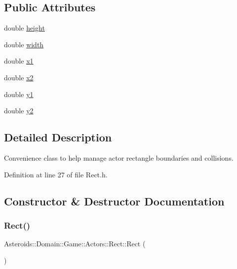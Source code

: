 \subsection*{Public Attributes}
\begin{DoxyCompactItemize}
\item 
double \hyperlink{classAsteroids_1_1Domain_1_1Game_1_1Actors_1_1Rect_a60cb0fe29e20d550b38e93c50c160702}{height}
\item 
double \hyperlink{classAsteroids_1_1Domain_1_1Game_1_1Actors_1_1Rect_a5e4e95bead1beb09355881c4b657946a}{width}
\item 
double \hyperlink{classAsteroids_1_1Domain_1_1Game_1_1Actors_1_1Rect_a8e1850d7266d0378a5795d2ea1c1985a}{x1}
\item 
double \hyperlink{classAsteroids_1_1Domain_1_1Game_1_1Actors_1_1Rect_a13d39720b3adcec9938bdb292973dcc6}{x2}
\item 
double \hyperlink{classAsteroids_1_1Domain_1_1Game_1_1Actors_1_1Rect_acb50ec000477a068fb723dc5a184cdbe}{y1}
\item 
double \hyperlink{classAsteroids_1_1Domain_1_1Game_1_1Actors_1_1Rect_a85994dc2dcf0a09c649958b1fb8e6983}{y2}
\end{DoxyCompactItemize}


\subsection{Detailed Description}
Convenience class to help manage actor rectangle boundaries and collisions. 

Definition at line 27 of file Rect.\+h.



\subsection{Constructor \& Destructor Documentation}
\mbox{\label{classAsteroids_1_1Domain_1_1Game_1_1Actors_1_1Rect_a4e018b8938b343f70672695b58e5fa96}} 
\subsubsection{\texorpdfstring{Rect()}{Rect()}}
{\footnotesize\ttfamily Asteroids\+::\+Domain\+::\+Game\+::\+Actors\+::\+Rect\+::\+Rect (\begin{DoxyParamCaption}{ }\end{DoxyParamCaption})}



